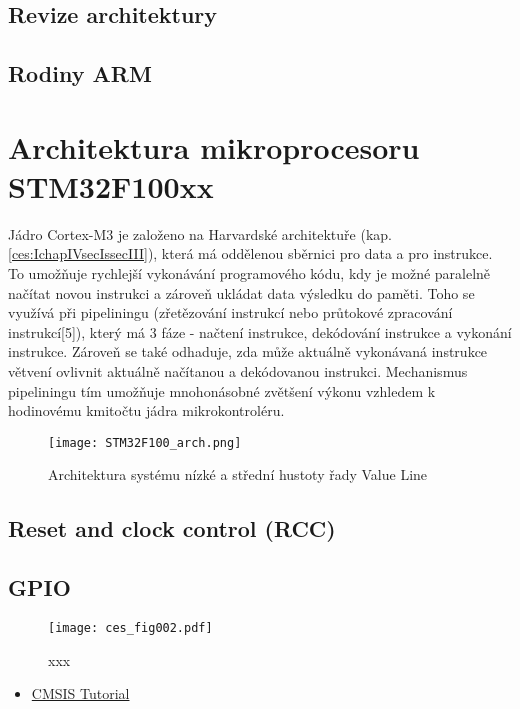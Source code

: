   \subsection{Revize architektury}
  \subsection{Rodiny ARM }


\section{Architektura mikroprocesoru STM32F100xx}
  Jádro Cortex-M3 je založeno na Harvardské architektuře (kap. \ref{ces:IchapIVsecIssecIII}), která 
  má oddělenou sběrnici pro data a pro instrukce. To umožňuje rychlejší vykonávání programového 
  kódu, kdy je možné paralelně načítat novou instrukci a zároveň ukládat data výsledku do paměti. 
  Toho se využívá při pipeliningu (zřetězování instrukcí nebo průtokové zpracování instrukcí[5]), 
  který má 3 fáze - načtení instrukce, dekódování instrukce a vykonání instrukce. Zároveň se také 
  odhaduje, zda může aktuálně vykonávaná instrukce větvení ovlivnit aktuálně načítanou a 
  dekódovanou instrukci. Mechanismus pipeliningu tím umožňuje mnohonásobné zvětšení výkonu vzhledem 
  k hodinovému kmitočtu jádra mikrokontroléru.  
  \begin{figure}[ht!] %
    \centering
    \texttt{[image: STM32F100\_arch.png]}
    \caption{Architektura systému nízké a střední hustoty řady Value Line}
    \label{MIT:fig_stm32f100arch}
  \end{figure}
  
  \subsection{Reset and clock control (RCC)}
  \subsection{GPIO}
  
  \begin{figure}[ht!] %
    \centering
    \texttt{[image: ces\_fig002.pdf]}
    \caption{xxx}
    \label{CES:fig002}
  \end{figure}
   


  \begin{itemize}
    \item \href{http://librarian/stable.php?id=141}{CMSIS Tutorial}
  \end{itemize}
  

